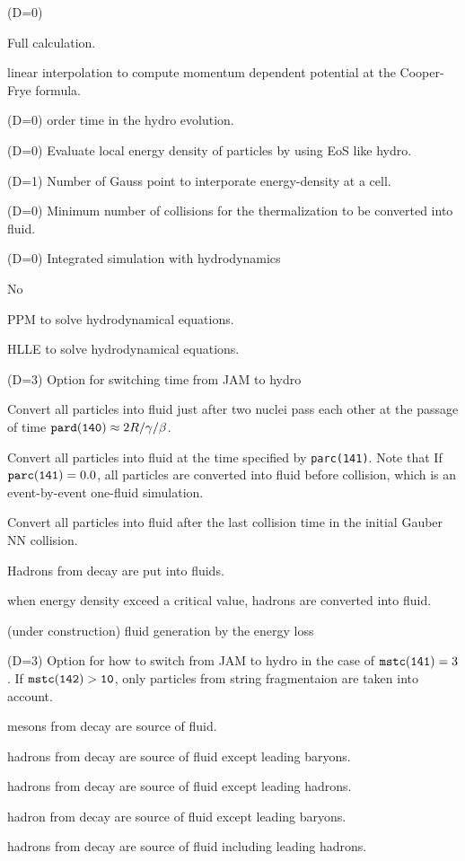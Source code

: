 \documentclass[]{article}
\newenvironment{entry}%
{\begin{list}{}{\setlength{\topsep}{0mm} \setlength{\itemsep}{0mm}
\setlength{\parskip}{0mm} \setlength{\parsep}{0mm}
\setlength{\leftmargin}{20mm} \setlength{\rightmargin}{0mm}
\setlength{\labelwidth}{18mm} \setlength{\labelsep}{2mm}}}%
{\end{list}}
\newenvironment{subentry}%
{\begin{list}{}{\setlength{\topsep}{0mm} \setlength{\itemsep}{0mm}
\setlength{\parskip}{0mm} \setlength{\parsep}{0mm}
\setlength{\leftmargin}{10mm} \setlength{\rightmargin}{0mm}
\setlength{\labelwidth}{18mm} \setlength{\labelsep}{2mm}}}%
{\end{list}}
\newcommand{\itemt}[1]{\item[{\tt #1}\hfill]}
\begin{document}
\begin{entry}
\itemt{mstc(135) :}(D=0) 
 \begin{subentry}
    \itemt{$=0$ :} Full calculation.
    \itemt{$=1$ :} linear interpolation to compute momentum dependent
potential at the Cooper-Frye formula.
 \end{subentry}


\itemt{mstc(136) :}(D=0) order time in the  hydro evolution.

\itemt{mstc(137) :}(D=0) Evaluate local energy density of particles
by using EoS like hydro.

\itemt{mstc(138) :}(D=1) Number of Gauss point to interporate energy-density
at a cell.

\itemt{mstc(139) :}(D=0) Minimum number of collisions for the thermalization
 to be converted into fluid.

\itemt{mstc(140) :}(D=0) Integrated simulation with hydrodynamics
 \begin{subentry}
    \itemt{$=0$ :} No
    \itemt{$=1$ :} PPM to solve hydrodynamical equations.
    \itemt{$=2$ :} HLLE to solve hydrodynamical equations.
 \end{subentry}

\itemt{mstc(141) :}(D=3) Option for switching time from JAM to hydro
 \begin{subentry}
    \itemt{$=0$ :} Convert all particles into fluid
    just after two nuclei pass each other at the passage of
    time ${\tt pard(140)}\approx 2R/\gamma/\beta$.
    \itemt{$=1$ :} Convert all particles into fluid
    at the time specified by {\tt parc(141)}. 
      Note that If ${\tt parc(141)}=0.0$,
      all particles are converted into fluid before collision, 
      which is an event-by-event one-fluid simulation.

    \itemt{$=2$ :} Convert all particles into fluid after the
    last collision time in the initial Gauber NN collision.

    \itemt{$=3$ :} Hadrons from decay are put into fluids.
    \itemt{$=4$ :} when energy density exceed a critical value, hadrons
    are converted into fluid.

    \itemt{$=5$ :} (under construction) fluid generation by the energy loss
 \end{subentry}

\itemt{mstc(142) :}(D=3) Option for how to switch from JAM to hydro
in the case of ${\tt mstc(141)}=3$.
If ${\tt mstc(142)>10}$, only particles from string fragmentaion 
are taken into account.
 \begin{subentry}
    \itemt{$=1$ or 11 :} mesons from decay are source of fluid.
    \itemt{$=2$ or 12 :} hadrons from decay are source of fluid except leading
    baryons.
    \itemt{$=3$ or,13 :} hadrons from decay are source of fluid except leading
     hadrons.
    \itemt{$=4$ or,13 :} hadron from decay are source of fluid except leading
     baryons.
    \itemt{$=5$ or,14 :} hadrons from decay are source of fluid
    including leading hadrons.
\end{subentry}


\end{entry}
\end{document}
